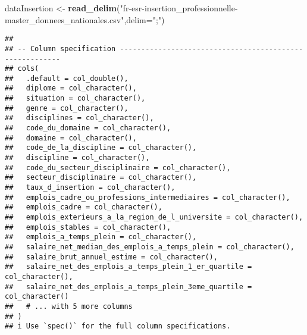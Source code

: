 \documentclass[
]{article}
\newenvironment{Shaded}{\begin{snugshade}}{\end{snugshade}}
\newcommand{\DataTypeTok}[1]{\textcolor[rgb]{0.13,0.29,0.53}{#1}}
\newcommand{\KeywordTok}[1]{\textcolor[rgb]{0.13,0.29,0.53}{\textbf{#1}}}
\newcommand{\NormalTok}[1]{#1}
\newcommand{\StringTok}[1]{\textcolor[rgb]{0.31,0.60,0.02}{#1}}
\begin{document}
\begin{Shaded}
\begin{Highlighting}[]
\NormalTok{dataInsertion <-}\StringTok{ }\KeywordTok{read_delim}\NormalTok{(}\StringTok{"fr-esr-insertion_professionnelle-master_donnees_nationales.csv"}\NormalTok{,}\DataTypeTok{delim=}\StringTok{";"}\NormalTok{)}
\end{Highlighting}
\end{Shaded}

\begin{verbatim}
## 
## -- Column specification --------------------------------------------------------
## cols(
##   .default = col_double(),
##   diplome = col_character(),
##   situation = col_character(),
##   genre = col_character(),
##   disciplines = col_character(),
##   code_du_domaine = col_character(),
##   domaine = col_character(),
##   code_de_la_discipline = col_character(),
##   discipline = col_character(),
##   code_du_secteur_disciplinaire = col_character(),
##   secteur_disciplinaire = col_character(),
##   taux_d_insertion = col_character(),
##   emplois_cadre_ou_professions_intermediaires = col_character(),
##   emplois_cadre = col_character(),
##   emplois_exterieurs_a_la_region_de_l_universite = col_character(),
##   emplois_stables = col_character(),
##   emplois_a_temps_plein = col_character(),
##   salaire_net_median_des_emplois_a_temps_plein = col_character(),
##   salaire_brut_annuel_estime = col_character(),
##   salaire_net_des_emplois_a_temps_plein_1_er_quartile = col_character(),
##   salaire_net_des_emplois_a_temps_plein_3eme_quartile = col_character()
##   # ... with 5 more columns
## )
## i Use `spec()` for the full column specifications.
\end{verbatim}
\end{document}
